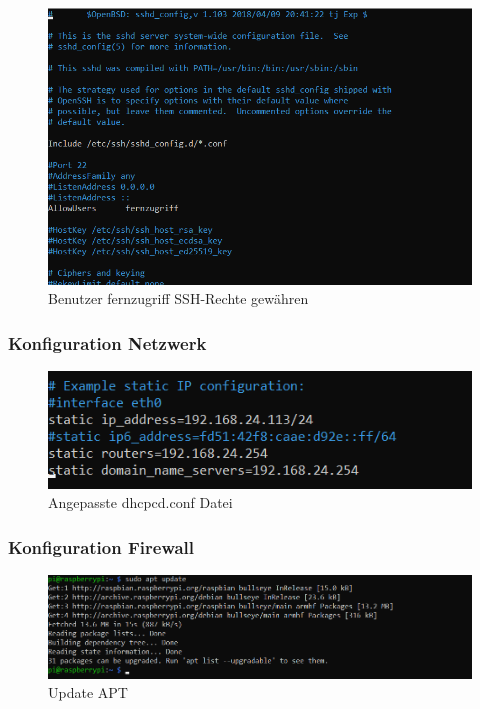 \documentclass[a4paper, 11pt]{scrartcl}
\begin{document}
\begin{figure}[H]
    \begin{center}
        \includegraphics[scale=1]{Bilder/ssh_fernzugriff.png}
        \caption{Benutzer \glqq fernzugriff\grqq{} SSH-Rechte gewähren}\label{pic:ssh_fernzugriff}
    \end{center}
\end{figure}


\subsubsection{Konfiguration Netzwerk}\label{ch:pics_network}
\begin{figure}[H]
    \begin{center}
        \includegraphics[scale=1]{Bilder/dhcpcdconf.png}
        \caption{Angepasste dhcpcd.conf Datei}\label{pic:dhcpcdconf}
    \end{center}
\end{figure}



\subsubsection{Konfiguration Firewall}\label{ch:pics_firewall}
\begin{figure}[H]
    \begin{center}
        \includegraphics[scale=0.7]{Bilder/update_apt.png}
        \caption{Update APT}\label{pic:udpate_apt}
    \end{center}
\end{figure}
\end{document}
